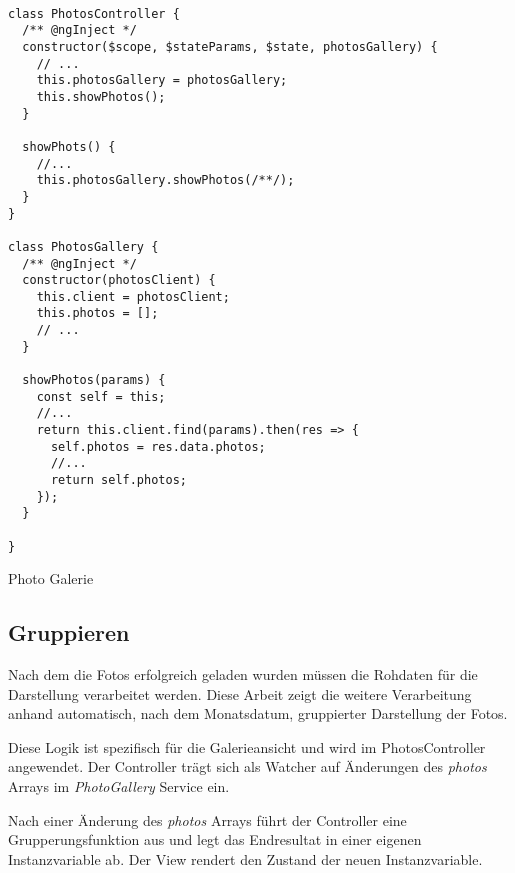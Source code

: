 \begin{listing}[H]
\begin{verbatim}

class PhotosController {
  /** @ngInject */
  constructor($scope, $stateParams, $state, photosGallery) {
    // ...
    this.photosGallery = photosGallery;
    this.showPhotos();
  }

  showPhots() {
    //...
    this.photosGallery.showPhotos(/**/);
  }
}

class PhotosGallery {
  /** @ngInject */
  constructor(photosClient) {
    this.client = photosClient;
    this.photos = [];
    // ...
  }
    
  showPhotos(params) {
    const self = this;
    //...
    return this.client.find(params).then(res => {
      self.photos = res.data.photos; 
      //...
      return self.photos;
    });
  }

}

\end{verbatim}
\caption{Photo Galerie}
\label{lst:photo_gallery}
\end{listing} 

\subsection{Gruppieren}

Nach dem die Fotos erfolgreich geladen wurden müssen die Rohdaten für die Darstellung verarbeitet werden. Diese Arbeit zeigt die weitere Verarbeitung anhand automatisch, nach dem Monatsdatum, gruppierter Darstellung der Fotos.

Diese Logik ist spezifisch für die Galerieansicht und wird im PhotosController angewendet. Der Controller trägt sich als Watcher auf Änderungen des \textit{photos} Arrays im \textit{PhotoGallery} Service ein. 

Nach einer Änderung des  \textit{photos} Arrays führt der Controller eine Grupperungsfunktion aus und legt das Endresultat in einer eigenen Instanzvariable ab. Der View rendert den Zustand der neuen Instanzvariable.

